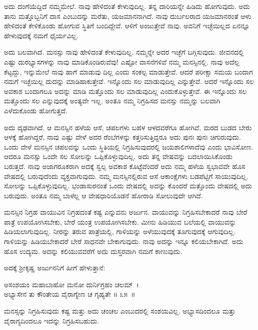 ಅದು ದಂಗೆಯೆದ್ದಿದೆ ನಮ್ಮಮೇಲೆ. ನಾವು ಹೇಳಿದಂತೆ ಕೇಳುವುದಿಲ್ಲ. ತನ್ನ ದಾರಿಯನ್ನೇ ಹಿಡಿದು ಹೋಗುವುದು. ಅದು ತಾನು ಮತ್ತೊಬ್ಬನಿಗೆ ದಾಸ ಎಂಬುದನ್ನು ಮರೆತು, ಯಜಮಾನ\-ನಾಗಿದೆ. ನಾವು ದುರ್ಬಲರಾದ ಯಜಮಾನರಂತೆ ಆಳು ಹೇಳಿದಂತೆ ಕೇಳಿಕೊಂಡು ಹೋಗುವ ಸ್ಥಿತಿಗೆ ಬಂದಿದ್ದೇವೆ. ಆಳಿಗೆ ಅಂಜುತ್ತೇವೆ ನಾವು. ಅವನಿಗೆ ಇಚ್ಛೆಯಿಲ್ಲದ ಏನನ್ನೂ ಹೇಳುವುದಕ್ಕೆ ನಮಗೆ ಧೈರ್ಯವಿಲ್ಲ.

ಅದು ಬಲವಾಗಿದೆ. ಮನಸ್ಸು ನಾವು ಹೇಳಿದಂತೆ ಕೇಳುವುದಿಲ್ಲ. ನಮ್ಮನ್ನೇ ಅದರ ಇಚ್ಛೆಗೆ ಬಗ್ಗಿಸುವುದು. ಜೀವನದಲ್ಲಿ ಎಷ್ಟು ದುರಭ್ಯಾಸಗಳನ್ನು ನಾವು ಮಾಡಿಕೊಂಡಿರುವೆವು! ಎಷ್ಟೋ ವಾಸನೆಗಳಿವೆ ನಮ್ಮ ಮನಸ್ಸಿನಲ್ಲಿ. ನಾವು ಅದೆಲ್ಲ ಕೆಟ್ಟದ್ದು, ಇನ್ನುಮೇಲೆ ನಾವು ಹಾಗೆ ಮಾಡುವು ದಿಲ್ಲ ಎಂದು ಸಂಕಲ್ಪ ಮಾಡುತ್ತೇವೆ. ಆದರೆ ಪರೀಕ್ಷಾ ಸಮಯ ಬಂದಾಗ ನಮಗೆ ಇಚ್ಛೆಯಿಲ್ಲ ದುದನ್ನು ಮಾಡಿಹಾಕುತ್ತೇವೆ. ಇನ್ನೊಂದು ಸಲ ಮಾಡುವುದಿಲ್ಲ ಎನ್ನುತ್ತೇವೆ. ಆದರೆ ಇನ್ನೊಂದು ಸಲ ಅವಕಾಶ ಬಂದಾಗಲೂ ಅದನ್ನು ಮಾಡಿ ಮತ್ತೊಂದು ಸಲ ಮಾಡುವುದಿಲ್ಲ ಎಂದುಕೊಳ್ಳುತ್ತೇವೆ. ಈ ಇನ್ನೊಂದು ಸಲ ಮತ್ತೊಂದು ಸಲ ಎನ್ನುವುದಕ್ಕೆ ಅಂತ್ಯವೇ ಇಲ್ಲ. ಅಂತೂ ನಮ್ಮ ನಿಗ್ರಹಿಸದ ಮನಸ್ಸು ನಮ್ಮನ್ನು ಬಲವಾಗಿ ಎಳೆದುಕೊಂಡು ಹೋಗುತ್ತದೆ.

ಅದು ದೃಢವಾಗಿದೆ. ಆ ಮನಸ್ಸಿನ ಹಳೆಯ ಆಸೆ, ಚಪಲಗಳು ಬಹಳ ಆಳದವರೆಗೂ ಹೋಗಿವೆ. ಮರದ ಬುಡದ ಬೇರು ಆಳಕ್ಕೆ ಹೋಗಿದ್ದರೆ, ನಾವು ಎಷ್ಟು ವೇಳೆ ಅದರ ರೆಂಬೆಗಳನ್ನು ಕತ್ತರಿಸುತ್ತಿದ್ದರೂ ಅದು ಪುನಃ ಪುನಃ ಚಿಗುರುವುದು. ಒಂದು ವೇಳೆ ಮನಸ್ಸಿನ ಚಪಲವನ್ನು ಒಂದು ಸ್ಥಿತಿಯಲ್ಲಿ ನಿಗ್ರಹಿಸುವುದರಲ್ಲಿ ಜಯಶಾಲಿಗಳಾದೆವು ಎಂದು ಭಾವಿಸೋಣ. ಆದರೂ ಮನಸ್ಸು ಒಂದೇ ಸಲ ಸೋಲನ್ನು ಒಪ್ಪಿಕೊಳ್ಳುವುದಿಲ್ಲ. ಅದು ತನ್ನ ವೇಷವನ್ನು ಬದಲಾಯಿಸಿಕೊಂಡು ಬರುತ್ತದೆ. ನಾವು ಅಜಾಗರೂಕರಾಗಿ ಅದಕ್ಕೆ ಸ್ವಲ್ಪ ಅವಕಾಶ ಕೊಟ್ಟೆವೆಂದರೆ ಅದು ನಮ್ಮ ಹಳೆಯ ಸ್ವಭಾವವೇ ಹೊಸ ವೇಷದಲ್ಲಿ ಬರುವುದೆಂದು ವ್ಯಕ್ತವಾಗುವುದು. ನಮ್ಮ ಮನಸ್ಸಿನಲ್ಲಿರುವ ಆಸೆ ಆಕಾಂಕ್ಷೆಗಳು ಬಡಪೆಟ್ಟಿಗೆ ಸಾಯುವುದಿಲ್ಲ. ಸೋಲನ್ನು ಒಪ್ಪಿಕೊಳ್ಳುವುದಿಲ್ಲ. ಭಂಡಾಸುರನಂತೆ ಒಂದು ವೇಷದಲ್ಲಿ ಅದನ್ನು ಕೊಂದರೆ ಮತ್ತೊಂದು ವೇಷದಲ್ಲಿ ಅದು ಬರುವುದು. ಅಂತೂ ನಮ್ಮ ಬಾಳೆಲ್ಲ ಆ ವೇಷಧಾರಿಯೊಡನೆ ಹೋರಾಡಿ ಸೋಲುವುದೇ ಆಗಿದೆ.

ಮನಸ್ಸಿನ ನಿಗ್ರಹ ವಾಯುವಿನ ನಿಗ್ರಹದಂತೆ ಕಷ್ಟ ಎನ್ನುವನು ಅರ್ಜುನ. ವಾಯುವನ್ನು ನಿಗ್ರಹಿಸಬೇಕಾದರೆ ನಾವು ಬೇರೆ ಪಾತ್ರೆ ಉಪಯೋಗಿಸಬೇಕು, ಬೇರೆ ಯಂತ್ರ ಉಪಯೋಗಿಸಬೇಕು. ಮೀನು ಹಿಡಿಯುವ ಬಲೆಯಲ್ಲಿ ವಾಯುವನ್ನು ಹಿಡಿಯಲಾಗುವುದಿಲ್ಲ. ನೀರನ್ನು ತರುವ ಪಾತ್ರೆಯಲ್ಲಿ, ಗಾಳಿಯನ್ನು ಅಳೆಯುವುದಕ್ಕೆ ತೂಗುವುದಕ್ಕೆ ಆಗುವುದಿಲ್ಲ. ಗಾಳಿಯನ್ನು ಹಿಡಿಯಬೇಕಾದರೆ ಬೇರೆ ಸಾಧನವೇ ಬೇಕಾಗುವುದು. ನಾವು ಅದನ್ನು ಇನ್ನೂ ಕಲಿಯಬೇಕಾಗಿದೆ. ಅದು ಹೊಸ ಉದ್ಯಮ. ಅದನ್ನು ಕಲಿಯುವವರೆಗೆ ಅದು ದುಸ್ತರವಾಗಿ ನಮಗೆ ಕಾಣುವುದು.

ಅದಕ್ಕೆ ಶ‍್ರೀಕೃಷ್ಣ ಅರ್ಜುನನಿಗೆ ಹೀಗೆ ಹೇಳುತ್ತಾನೆ:

\begin{shloka}
ಅಸಂಶಯಂ ಮಹಾಬಾಹೋ ಮನೋ ದುರ್ನಿಗ್ರಹಂ ಚಲಮ್~।\\ಅಭ್ಯಾಸೇನ ತು ಕೌಂತೇಯ ವೈರಾಗ್ಯೇಣ ಚ ಗೃಹ್ಯತೇ \hfill॥ ೩೫~॥
\end{shloka}

\begin{artha}
ಮನಸ್ಸನ್ನು ನಿಗ್ರಹಿಸುವುದು ಕಷ್ಟ ಮತ್ತು ಅದು ಚಂಚಲ ಎಂಬುದರಲ್ಲಿ ಸಂಶಯವಿಲ್ಲ. ಅಭ್ಯಾಸ\-ದಿಂದಲೂ ಮತ್ತು ವೈರಾಗ್ಯದಿಂದಲೂ ಇದನ್ನು ನಿಗ್ರಹಿಸಬಹುದು.
\end{artha}

